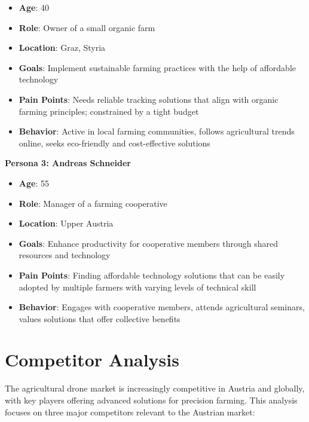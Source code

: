 \begin{itemize} 
	\item \textbf{Age}: 40 
	\item \textbf{Role}: Owner of a small organic farm 
	\item \textbf{Location}: Graz, Styria 
	\item \textbf{Goals}: Implement sustainable farming practices with the help of affordable technology 
	\item \textbf{Pain Points}: Needs reliable tracking solutions that align with organic farming principles; constrained by a tight budget 
	\item \textbf{Behavior}: Active in local farming communities, follows agricultural trends online, seeks eco-friendly and cost-effective solutions 
\end{itemize}

\textbf{Persona 3: Andreas Schneider}

\begin{itemize} 
	\item \textbf{Age}: 55 
	\item \textbf{Role}: Manager of a farming cooperative 
	\item \textbf{Location}: Upper Austria 
	\item \textbf{Goals}: Enhance productivity for cooperative members through shared resources and technology 
	\item \textbf{Pain Points}: Finding affordable technology solutions that can be easily adopted by multiple farmers with varying levels of technical skill 
	\item \textbf{Behavior}: Engages with cooperative members, attends agricultural seminars, values solutions that offer collective benefits 
\end{itemize}

\section{Competitor Analysis}

The agricultural drone market is increasingly competitive in Austria and globally, with key players offering advanced solutions for precision farming. This analysis focuses on three major competitors relevant to the Austrian market:

